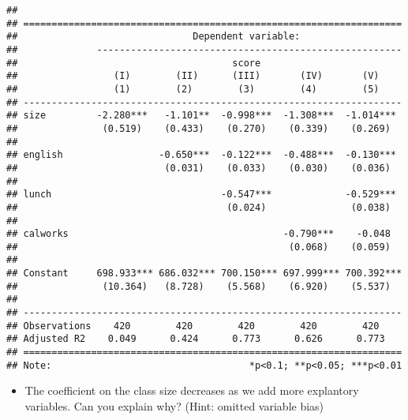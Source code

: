 \documentclass[]{book}
\providecommand{\tightlist}{%
  \setlength{\itemsep}{0pt}\setlength{\parskip}{0pt}}
\begin{document}
\begin{verbatim}
## 
## ===================================================================
##                               Dependent variable:                  
##              ------------------------------------------------------
##                                      score                         
##                 (I)        (II)      (III)       (IV)       (V)    
##                 (1)        (2)        (3)        (4)        (5)    
## -------------------------------------------------------------------
## size         -2.280***   -1.101**  -0.998***  -1.308***  -1.014*** 
##               (0.519)    (0.433)    (0.270)    (0.339)    (0.269)  
##                                                                    
## english                 -0.650***  -0.122***  -0.488***  -0.130*** 
##                          (0.031)    (0.033)    (0.030)    (0.036)  
##                                                                    
## lunch                              -0.547***             -0.529*** 
##                                     (0.024)               (0.038)  
##                                                                    
## calworks                                      -0.790***    -0.048  
##                                                (0.068)    (0.059)  
##                                                                    
## Constant     698.933*** 686.032*** 700.150*** 697.999*** 700.392***
##               (10.364)   (8.728)    (5.568)    (6.920)    (5.537)  
##                                                                    
## -------------------------------------------------------------------
## Observations    420        420        420        420        420    
## Adjusted R2    0.049      0.424      0.773      0.626      0.773   
## ===================================================================
## Note:                                   *p<0.1; **p<0.05; ***p<0.01
\end{verbatim}

\begin{itemize}
\tightlist
\item
  The coefficient on the class size decreases as we add more explantory variables. Can you explain why? (Hint: omitted variable bias)
\end{itemize}
\end{document}
